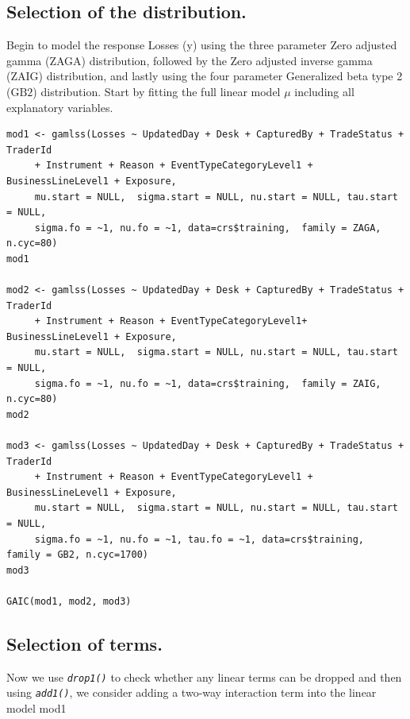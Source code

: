 \documentclass{DissertateUSU}
\begin{document}
\normalsize

\subsection{Selection of the distribution.}
\label{sec:Selection of the distribution.}

Begin to model the response Losses (y) using the three parameter Zero
adjusted gamma (ZAGA) distribution, followed by the Zero adjusted
inverse gamma (ZAIG) distribution, and lastly using the four parameter
Generalized beta type 2 (\(\mbox{GB}2\)) distribution. Start by fitting
the full linear model \(\mu\) including all explanatory variables.

\small

\begin{verbatim}
mod1 <- gamlss(Losses ~ UpdatedDay + Desk + CapturedBy + TradeStatus + TraderId 
     + Instrument + Reason + EventTypeCategoryLevel1 + BusinessLineLevel1 + Exposure,
     mu.start = NULL,  sigma.start = NULL, nu.start = NULL, tau.start = NULL,
     sigma.fo = ~1, nu.fo = ~1, data=crs$training,  family = ZAGA, n.cyc=80)
mod1

mod2 <- gamlss(Losses ~ UpdatedDay + Desk + CapturedBy + TradeStatus + TraderId
     + Instrument + Reason + EventTypeCategoryLevel1+ BusinessLineLevel1 + Exposure,
     mu.start = NULL,  sigma.start = NULL, nu.start = NULL, tau.start = NULL,
     sigma.fo = ~1, nu.fo = ~1, data=crs$training,  family = ZAIG, n.cyc=80)
mod2

mod3 <- gamlss(Losses ~ UpdatedDay + Desk + CapturedBy + TradeStatus + TraderId 
     + Instrument + Reason + EventTypeCategoryLevel1 + BusinessLineLevel1 + Exposure,
     mu.start = NULL,  sigma.start = NULL, nu.start = NULL, tau.start = NULL,
     sigma.fo = ~1, nu.fo = ~1, tau.fo = ~1, data=crs$training,  family = GB2, n.cyc=1700)
mod3

GAIC(mod1, mod2, mod3)
\end{verbatim}

\normalsize

\subsection{Selection of terms.}
\label{sec:Selection of terms.}

Now we use \emph{\texttt{drop1()}} to check whether any linear terms can
be dropped and then using \emph{\texttt{add1()}}, we consider adding a
two-way interaction term into the linear model mod1
\end{document}
